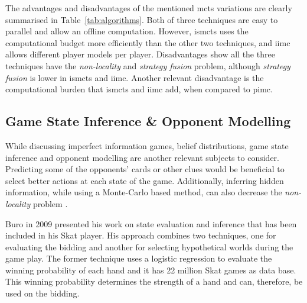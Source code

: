 The advantages and disadvantages of the mentioned \ac{mcts} variations are clearly summarised in Table~\ref{tab:algorithms}.
Both of three techniques are easy to parallel and allow an offline computation. However, \ac{ismcts} uses the computational budget more efficiently than the other two techniques, and \ac{iimc} allows different player models per player.
Disadvantages show all the three techniques have the \emph{non-locality} and \emph{strategy fusion} problem, although \emph{strategy fusion} is lower in \ac{ismcts} and \ac{iimc}.
Another relevant disadvantage is the computational burden that \ac{ismcts} and \ac{iimc} add, when compared to \ac{pimc}.







\subsection{Game State Inference \& Opponent Modelling}


While discussing imperfect information games, belief distributions, game state inference and opponent modelling are another relevant subjects to consider.
Predicting some of the opponents' cards or other clues would be beneficial to select better actions at each state of the game. Additionally, inferring hidden information, while using a Monte-Carlo based method, can also decrease the \emph{non-locality} problem \cite{Cowling2012}.


Buro in 2009 \cite{Buro} presented his work on state evaluation and inference that has been included in his Skat player.
His approach combines two techniques, one for evaluating the bidding and another for selecting hypothetical worlds during the game play.
The former technique uses a logistic regression to evaluate the winning probability of each hand and it has 22 million Skat games as data base.
This winning probability determines the strength of a hand and can, therefore, be used on the bidding.


